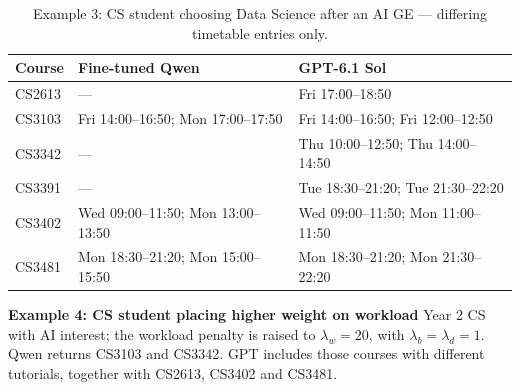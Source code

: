 \documentclass{article}
\begin{document}
\begin{table}[H]
\centering\small
\caption{Example 3: CS student choosing Data Science after an AI GE --- differing timetable entries only.}
\begin{tabular}{p{.6in}p{2.2in}p{2.2in}}
\toprule
Course & Fine-tuned Qwen & GPT-6.1 Sol\\
\midrule
{\raggedright CS2613\par} & {\raggedright ---\par} & {\raggedright Fri 17:00--18:50\par}\\
{\raggedright CS3103\par} & {\raggedright Fri 14:00--16:50; Mon 17:00--17:50\par} & {\raggedright Fri 14:00--16:50; Fri 12:00--12:50\par}\\
{\raggedright CS3342\par} & {\raggedright ---\par} & {\raggedright Thu 10:00--12:50; Thu 14:00--14:50\par}\\
{\raggedright CS3391\par} & {\raggedright ---\par} & {\raggedright Tue 18:30--21:20; Tue 21:30--22:20\par}\\
{\raggedright CS3402\par} & {\raggedright Wed 09:00--11:50; Mon 13:00--13:50\par} & {\raggedright Wed 09:00--11:50; Mon 11:00--11:50\par}\\
{\raggedright CS3481\par} & {\raggedright Mon 18:30--21:20; Mon 15:00--15:50\par} & {\raggedright Mon 18:30--21:20; Mon 21:30--22:20\par}\\
\bottomrule
\end{tabular}
\label{tab:comparison04-3}
\end{table}

\textbf{Example 4: CS student placing higher weight on workload} Year 2 CS with AI interest; the workload penalty is raised to $\lambda_w=20$, with $\lambda_b=\lambda_d=1$. Qwen returns CS3103 and CS3342. GPT includes those courses with different tutorials, together with CS2613, CS3402 and CS3481.
\end{document}
